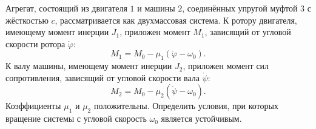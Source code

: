 Агрегат, состоящий из двигателя $1$ и машины $2$,
соединённых упругой муфтой $3$ с жёсткостью $c$,
рассматривается как двухмассовая система.
К ротору двигателя, имеющему момент инерции $J_1$,
приложен момент $M_1$, зависящий от угловой скорости ротора $\dot{\varphi}$:
$$M_1 = M_0 - \mu _1(\dot{\varphi} - \omega _0).$$
К валу машины, имеющему момент инерции $J_2$, приложен момент сил сопротивления,
зависящий от угловой скорости вала $\dot{\psi}$:
$$M_2 = M_0 - \mu _2(\dot{\psi} - \omega _0).$$
Коэффициенты $\mu _1$ и $\mu _2$ положительны.
Определить условия, при которых вращение системы с угловой скорость
$\omega _0$ является устойчивым.
